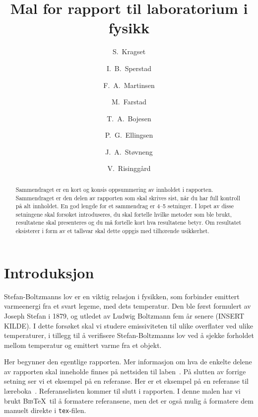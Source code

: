 \begin{frontmatter}

\title{Mal for rapport til laboratorium i fysikk}

\author[fysikk]{S.~Kragset}
\author[fysikk]{I.~B.~Sperstad}
\author[fysikk]{F.~A.~Martinsen}
\author[fysikk]{M.~Farstad}
\author[fysikk]{T.~A.~Bojesen}
\author[fysikk]{P.~G.~Ellingsen}
\author[fysikk]{J.~A.~Støvneng}
\author[fysikk]{V.~Risinggård}
\address[fysikk]{Institutt for fysikk, Norges teknisk-naturvitenskapelige universitet, 7491 Trondheim.}

\begin{abstract}
Sammendraget er en kort og konsis oppsummering av innholdet i rapporten. Sammendraget er den delen av rapporten som skal skrives sist, når du har full kontroll på alt innholdet. En god lengde for et sammendrag er 4--5 setninger. I løpet av disse setningene skal forsøket introduseres, du skal fortelle hvilke metoder som ble brukt, resultatene skal presenteres og du må fortelle kort hva resultatene betyr. Om resultatet eksisterer i form av et tallsvar skal dette oppgis med tilhørende usikkerhet. 
\end{abstract}

\end{frontmatter}


\section{Introduksjon}
Stefan-Boltzmanns lov er en viktig relasjon i fysikken, som forbinder emittert varmeenergi  fra et svart legeme, med dets temperatur. Den ble først formulert av Joseph Stefan i 1879, og utledet av Ludwig Boltzmann fem år senere (INSERT KILDE). I dette forsøket skal vi studere emissiviteten til ulike overflater ved ulike temperaturer, i tillegg til å verifisere Stefan-Boltzmanns lov ved å sjekke forholdet mellom temperatur og emittert varme fra et objekt.

Her begynner den egentlige rapporten. Mer informasjon om hva de enkelte delene av rapporten skal inneholde finnes på nettsiden til laben~\cite{labside}. På slutten av forrige setning ser vi et eksempel på en referanse. Her er et eksempel på en referanse til læreboka~\cite{Young2016}. Referanselisten kommer til slutt i rapporten. I denne malen har vi brukt \textsc{Bib}\TeX\ til å formatere referansene, men det er også mulig å formatere dem manuelt direkte i \texttt{tex}-filen. 



